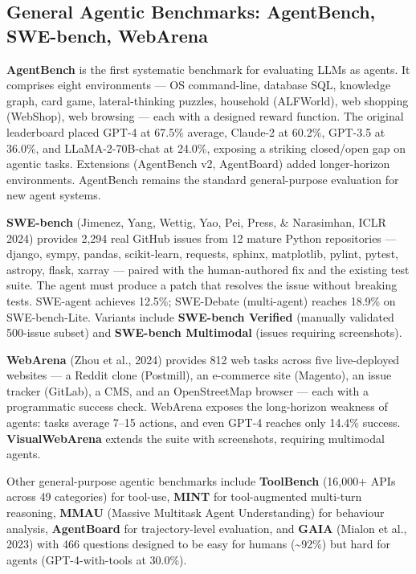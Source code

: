 \documentclass{article}
\begin{document}
\subsection{General Agentic Benchmarks: AgentBench, SWE-bench, WebArena}\label{general-agentic-benchmarks-agentbench-swe-bench-webarena}

\textbf{AgentBench} \citep{liu20232023} is the first systematic benchmark for evaluating LLMs as agents. It comprises eight environments --- OS command-line, database SQL, knowledge graph, card game, lateral-thinking puzzles, household (ALFWorld), web shopping (WebShop), web browsing --- each with a designed reward function. The original leaderboard placed GPT-4 at 67.5\% average, Claude-2 at 60.2\%, GPT-3.5 at 36.0\%, and LLaMA-2-70B-chat at 24.0\%, exposing a striking closed/open gap on agentic tasks. Extensions (AgentBench v2, AgentBoard) added longer-horizon environments. AgentBench remains the standard general-purpose evaluation for new agent systems.

\textbf{SWE-bench} (Jimenez, Yang, Wettig, Yao, Pei, Press, \& Narasimhan, ICLR 2024) provides 2,294 real GitHub issues from 12 mature Python repositories --- django, sympy, pandas, scikit-learn, requests, sphinx, matplotlib, pylint, pytest, astropy, flask, xarray --- paired with the human-authored fix and the existing test suite. The agent must produce a patch that resolves the issue without breaking tests. SWE-agent achieves 12.5\%; SWE-Debate (multi-agent) reaches 18.9\% on SWE-bench-Lite. Variants include \textbf{SWE-bench Verified} (manually validated 500-issue subset) and \textbf{SWE-bench Multimodal} (issues requiring screenshots).

\textbf{WebArena} (Zhou et al., 2024) provides 812 web tasks across five live-deployed websites --- a Reddit clone (Postmill), an e-commerce site (Magento), an issue tracker (GitLab), a CMS, and an OpenStreetMap browser --- each with a programmatic success check. WebArena exposes the long-horizon weakness of agents: tasks average 7--15 actions, and even GPT-4 reaches only 14.4\% success. \textbf{VisualWebArena} extends the suite with screenshots, requiring multimodal agents.

Other general-purpose agentic benchmarks include \textbf{ToolBench} (16,000+ APIs across 49 categories) for tool-use, \textbf{MINT} for tool-augmented multi-turn reasoning, \textbf{MMAU} (Massive Multitask Agent Understanding) for behaviour analysis, \textbf{AgentBoard} for trajectory-level evaluation, and \textbf{GAIA} (Mialon et al., 2023) with 466 questions designed to be easy for humans (\textasciitilde92\%) but hard for agents (GPT-4-with-tools at 30.0\%).
\end{document}
